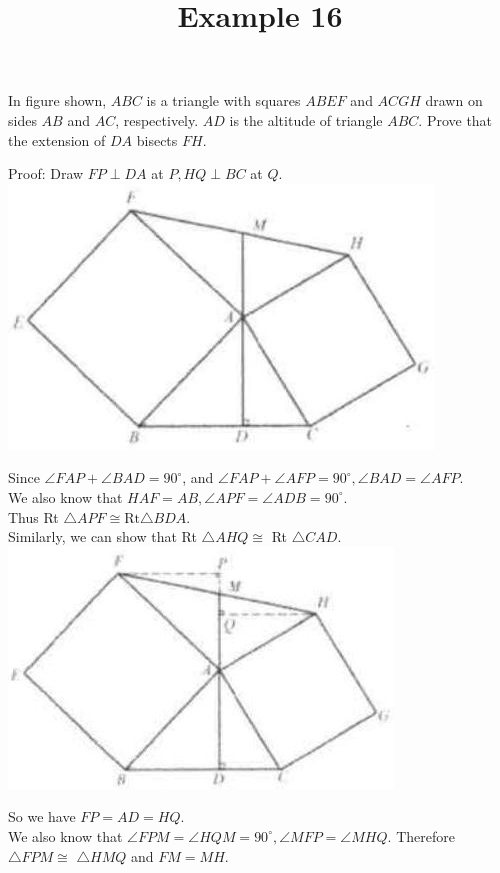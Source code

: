 \documentclass{article}
\title{Example 16}
\date{}
\begin{document}
\maketitle

In figure shown, \(A B C\) is a triangle with squares \(A B E F\) and \(A C G H\) drawn on sides \(A B\) and \(A C\), respectively. \(A D\) is the altitude of triangle \(A B C\). Prove that the extension of \(D A\) bisects \(F H\).

Proof:
Draw \(F P \perp D A\) at \(P, H Q \perp B C\) at \(Q\).\\
\centering
\includegraphics[width=\textwidth]{images/problem_image_1.jpg}

Since \(\angle F A P+\angle B A D=90^{\circ}\), and \(\angle F A P+\angle A F P=90^{\circ}, \angle B A D=\angle A F P\).\\
We also know that \(H A F=A B, \angle A P F=\angle A D B=90^{\circ}\).\\
Thus Rt \(\triangle A P F \cong \mathrm{Rt} \triangle B D A\).\\
Similarly, we can show that Rt \(\triangle A H Q \cong\) Rt \(\triangle C A D\).\\
\centering
\includegraphics[width=\textwidth]{images/reasoning_image_1.jpg}

So we have \(F P=A D=H Q\).\\
We also know that \(\angle F P M=\angle H Q M=90^{\circ}, \angle M F P=\angle M H Q\). Therefore \(\triangle F P M \cong\) \(\triangle H M Q\) and \(F M=M H\).
\end{document}
